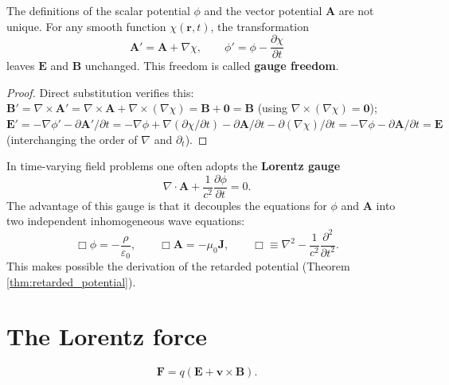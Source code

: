 \begin{property}\label{prop:gauge_freedom}
The definitions of the scalar potential $\phi$ and the vector potential $\mathbf{A}$ are not unique. For any smooth function $\chi(\mathbf{r}, t)$, the transformation
\[
\mathbf{A}' = \mathbf{A} + \nabla \chi, \qquad \phi' = \phi - \frac{\partial \chi}{\partial t}
\]
leaves $\mathbf{E}$ and $\mathbf{B}$ unchanged. This freedom is called \textbf{gauge freedom}.
\end{property}

\begin{proof}
Direct substitution verifies this: $\mathbf{B}' = \nabla\times\mathbf{A}' = \nabla\times\mathbf{A} + \nabla\times(\nabla\chi) = \mathbf{B} + \mathbf{0} = \mathbf{B}$ (using $\nabla\times(\nabla\chi) = \mathbf{0}$); $\mathbf{E}' = -\nabla\phi' - \partial\mathbf{A}'/\partial t = -\nabla\phi + \nabla(\partial\chi/\partial t) - \partial\mathbf{A}/\partial t - \partial(\nabla\chi)/\partial t = -\nabla\phi - \partial\mathbf{A}/\partial t = \mathbf{E}$ (interchanging the order of $\nabla$ and $\partial_t$).
\end{proof}

\begin{remark}\label{rem:lorentz_gauge}
In time-varying field problems one often adopts the \textbf{Lorentz gauge}
\[
\nabla \cdot \mathbf{A} + \frac{1}{c^2}\frac{\partial \phi}{\partial t} = 0.
\]
The advantage of this gauge is that it decouples the equations for $\phi$ and $\mathbf{A}$ into two independent inhomogeneous wave equations:
\[
\Box \phi = -\frac{\rho}{\varepsilon_0}, \qquad \Box \mathbf{A} = -\mu_0 \mathbf{J}, \qquad \Box \equiv \nabla^2 - \frac{1}{c^2}\frac{\partial^2}{\partial t^2}.
\]
This makes possible the derivation of the retarded potential (Theorem \ref{thm:retarded_potential}).
\end{remark}

\section{The Lorentz force}

\begin{axiom}\label{axm:lorentz_force}
\[
\boxed{\mathbf{F} = q(\mathbf{E} + \mathbf{v} \times \mathbf{B})}.
\]
\end{axiom}

